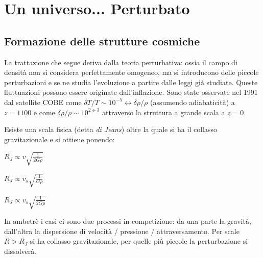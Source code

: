 \chapter{Un universo... Perturbato}\label{6:ch}

\section{Formazione delle strutture cosmiche}
La trattazione che segue deriva dalla teoria perturbativa: ossia il campo di densità non si considera perfettamente omogeneo, ma si introducono delle piccole perturbazioni e se ne studia l'evoluzione a partire dalle leggi già studiate. Queste fluttuazioni possono essere originate dall'inflazione. Sono state osservate nel 1991 dal satellite COBE come $\delta T / T \sim 10^{-5}\leftrightarrow \delta \rho / \rho$ (assumendo adiabaticità) a $z=1100$ e come $\delta \rho /\rho \sim 10^{2\div 3}$ attraverso la struttura a grande scala a $z=0$.

Esiste una scala fisica (detta \textit{di Jeans}) oltre la quale si ha il collasso gravitazionale e si ottiene ponendo:

\begin{example}[$\mathbf{E_{kin}=E_{pot}}$]
    $R_J \propto v \sqrt{\frac{1}{2 G \rho}} $
\end{example}
\begin{example}[$\mathbf{\bar{F}_{press}=\bar{g}}$]
    $R_J \propto v_s \sqrt{\frac{1}{G \rho}} $
\end{example}
\begin{example}[$\mathbf{\tau_{free\, fall}=\tau_{sound\, crossing}}$]
        $R_J \propto v_s \sqrt{\frac{1}{2 G \rho}} $
\end{example}
In ambetrè i casi ci sono due processi in competizione: da una parte la gravità, dall'altra la dispersione di velocità / pressione / attraversamento. 
Per scale $R>R_J$ si ha collasso gravitazionale, per quelle più piccole la perturbazione si dissolverà.


